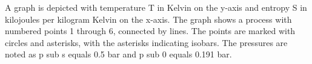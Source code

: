 A graph is depicted with temperature T in Kelvin on the y-axis and entropy S in kilojoules per kilogram Kelvin on the x-axis. The graph shows a process with numbered points 1 through 6, connected by lines. The points are marked with circles and asterisks, with the asterisks indicating isobars. The pressures are noted as p sub s equals 0.5 bar and p sub 0 equals 0.191 bar.